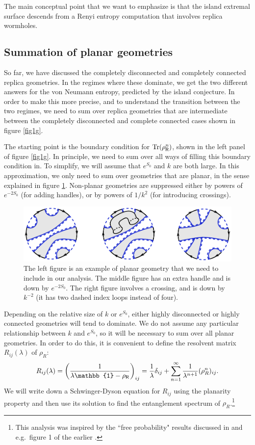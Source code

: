 \documentclass[12pt]{article}
\newcommand{\be}{\begin{equation}}
\newcommand{\ee}{\end{equation}}
\numberwithin{equation}{section}
\def\tr{\text{Tr}}
\begin{document}
The main conceptual point that we want to emphasize is that the island extremal surface descends from a Renyi entropy computation that involves replica wormholes.



\subsection{Summation of planar geometries} \label{sec:sumplanar}
So far, we have discussed the completely disconnected and completely connected replica geometries. In the regimes where these dominate, we get the two different answers for the von Neumann entropy, predicted by the island conjecture. In order to make this more precise, and to understand the transition between the two regimes, we need to sum over replica geometries that are intermediate between the completely disconnected and complete connected cases shown in figure \ref{fig1g}.

The starting point is the boundary condition for $\tr(\rho_{\sf{R}}^n)$, shown in the left panel of figure \ref{fig1g}. In principle, we need to sum over all ways of filling this boundary condition in. To simplify, we will assume that $e^{S_0}$ and $k$ are both large. In this approximation, we only need to sum over geometries that are planar, in the sense explained in figure \ref{fig:Crossing and Handle}. Non-planar geometries are suppressed either by powers of $e^{-2S_0}$ (for adding handles), or by powers of $1/k^2$ (for introducing crossings).
\begin{figure}[ht]
\centering
	\includegraphics[scale=0.7]{images/CrossingAndHandle.pdf}
	\caption{The left figure is an example of planar geometry that we need to include in our analysis. The middle figure has an extra handle and is down by $e^{-2S_0}$. The right figure involves a crossing, and is down by $k^{-2}$ (it has two dashed index loops instead of four).}
	\label{fig:Crossing and Handle}
\end{figure}

Depending on the relative size of $k$ or $e^{S_0}$, either highly disconnected or highly connected geometries will tend to dominate. We do not assume any particular relationship between $k$ and $e^{S_0}$, so it will be necessary to sum over all planar geometries. In order to do this, it is convenient to define the resolvent matrix $R_{ij}(\lambda)$ of $\rho_R$:
\be
R_{ij}(\lambda)=\left(\frac{1}{\lambda\mathbb{1}-\rho_{\sf{R}}}\right)_{ij} = \frac{1}{\lambda}\delta_{ij}+\sum\limits_{n=1}^{\infty}\frac{1}{\lambda^{n+1}}(\rho_R^n)_{ij}.
\ee
We will write down a Schwinger-Dyson equation for $R_{ij}$ using the planarity property and then use its solution to find the entanglement spectrum of $\rho_R$.\footnote{This analysis was inspired by the ``free probability" results discussed in \cite{speicher2009free} and e.g.~figure 1 of the earlier \cite{Cvitanovic:1980jz}.}
\end{document}
